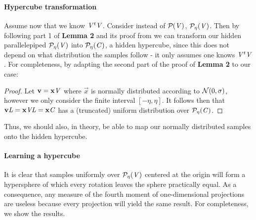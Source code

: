 \paragraph{Hypercube transformation}
Assume now that we know $\mat{V}^t \mat{V}$. Consider instead of $\PP{V}$, $\PP[\eta]{V}$.
Then by following part 1 of \textbf{Lemma 2} and its proof from \cite{NR09} we can transform our hidden parallelepiped $\PP[\eta]{V}$ into $\PP[\eta]{C}$, a hidden hypercube,
since this does not depend on what distribution the samples follow - it only assumes one knows $\mat{V}^t\mat{V}$.
For completeness, by adapting the second part of the proof of \textbf{Lemma 2} to our case: 
\begin{proof}
    Let $\vec{v} = \vec{x}\mat{V}$ where $\vec{x}$ is normally distributed according to $\normdist{0}{\sigma}$, however we only consider the finite interval $[-\eta,\eta]$.
    It follows then that $\vec{v}\mat{L} = \vec{x}\mat{V}\mat{L} = \vec{x}\mat{C}$ has a (truncated) uniform distribution over $\PP[\eta]{C}$.
\end{proof}
Thus, we should also, in theory, be able to map our normally distributed samples onto the hidden hypercube.

\paragraph{Learning a hypercube}
It is clear that samples uniformly over $\PP[\eta]{V}$ centered at the origin will form a hypersphere of which every rotation leaves the sphere practically equal. As a consequence, any measure of the fourth moment of one-dimensional projections are 
useless because every projection will yield the same result.
For completeness, we show the results.


